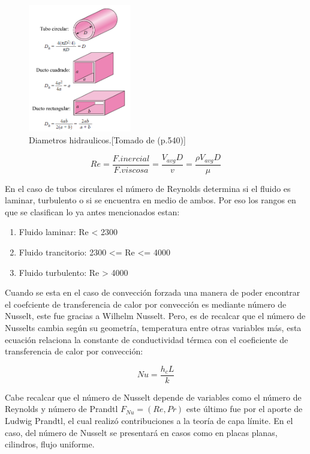 \documentclass[12pt,letterpaper]{article}     %
\begin{document}
\begin{figure}[H]
\centering
\includegraphics[width=0.4\textwidth]{diametrohidraulico-nuevo.png}
\caption{Diametros hidraulicos.[Tomado de \cite{yunus} (p.540)]}
\label{fig:diametrohidraulco}
\end{figure}

\begin{equation}
Re = \frac{F. inercial}{F. viscosa} = \frac{V_{avg}D}{v} = \frac{\rho V_{avg}D}{\mu}
    \label{eq:reynolds}
\end{equation}

En el caso de tubos circulares el número de Reynolds determina si el fluido es laminar, turbulento o si se encuentra en medio de ambos. Por eso los rangos en que se clasifican lo ya antes mencionados estan:


\begin{enumerate}
    \item Fluido laminar: Re < 2300
    \item Fluido trancitorio: 2300 <= Re <= 4000
    \item Fluido turbulento: Re > 4000
\end{enumerate}

Cuando se esta en el caso de convección forzada una manera de poder encontrar el coefciente de transferencia de calor por convección es mediante número de Nusselt, este fue gracias a Wilhelm Nusselt. Pero, es de recalcar que el número de Nusselts cambia según su geometría, temperatura entre otras variables más, esta ecuación relaciona la constante de conductividad térmca con el coeficiente de transferencia de calor por convección:

\begin{equation}
Nu = \frac{h_{c}L}{k}
    \label{eq:Nusselt}
\end{equation}

Cabe recalcar que el número de Nusselt depende de variables como el número de Reynolds y número de Prandtl $F_{Nu} = (Re,Pr)$ este último fue por el aporte de Ludwig Prandtl, el cual realizó contribuciones a la teoría de capa límite. En el caso, del número de Nusselt se presentará en casos como en placas planas, cilindros, flujo uniforme. \cite[p\ 812-813]{yunus} 
\end{document}
